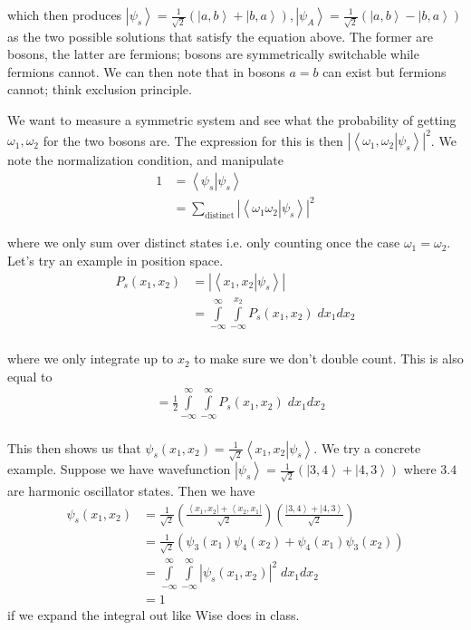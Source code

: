 \documentclass[10pt]{report}
\newcommand{\bra}[1]{\left<#1\right|}
\newcommand{\ket}[1]{\left|#1\right>}
\newcommand{\dotp}[2]{\left<#1\left.\right|#2\right>}
\newcommand{\abs}[1]{\left|#1\right|}
\begin{document}
which then produces $\ket{\psi_s} = \frac{1}{\sqrt{2}}\left(\ket{a,b} + \ket{b,a}\right), \ket{\psi_A} = \frac{1}{\sqrt{2}}\left(\ket{a,b}-\ket{b,a}\right)$ as the two possible solutions that satisfy the equation above. The former are bosons, the latter are fermions; bosons are symmetrically switchable while fermions cannot. We can then note that in bosons $a=b$ can exist but fermions cannot; think exclusion principle. 

We want to measure a symmetric system and see what the probability of getting $\omega_1, \omega_2$ for the two bosons are. The expression for this is then $\abs{\dotp{\omega_1,\omega_2}{\psi_s}}^2$. We note the normalization condition, and manipulate
\begin{align}
	1 &= \dotp{\psi_s}{\psi_s}\\
	&= \sum_{\textrm{distinct}} \abs{\dotp{\omega_1\omega_2}{\psi_s}}^2
\end{align}

where we only sum over distinct states i.e. only counting once the case $\omega_1 = \omega_2$. Let's try an example in position space.
\begin{align}
	P_s\left( x_1, x_2 \right) &= \abs{\dotp{x_1,x_2}{\psi_s}}\\
	&= \displaystyle\int\limits_{-\infty}^{\infty}\displaystyle\int\limits_{-\infty}^{x_2}P_s(x_1, x_2)\;dx_1dx_2\\
\end{align}

where we only integrate up to $x_2$ to make sure we don't double count. This is also equal to 
\begin{align}
	&= \frac{1}{2}\displaystyle\int\limits_{-\infty}^{\infty}\displaystyle\int\limits_{-\infty}^{\infty}P_s(x_1, x_2)\;dx_1dx_2\\
\end{align}

This then shows us that $\psi_s(x_1,x_2) = \frac{1}{\sqrt{2}}\dotp{x_1, x_2}{\psi_s}$. We try a concrete example. Suppose we have wavefunction $\ket{\psi_s} = \frac{1}{\sqrt{2}}\left(\ket{3,4} + \ket{4,3}\right)$ where $3.4$ are harmonic oscillator states. Then we have
\begin{align}
	\psi_s(x_1, x_2) &= \frac{1}{\sqrt{2}}\left( \frac{\bra{x_1,x_2} + \bra{x_2, x_1}}{\sqrt{2}} \right)\left( \frac{\ket{3,4} + \ket{4,3}}{\sqrt{2}} \right)\\
	&= \frac{1}{\sqrt{2}}\left( \psi_3(x_1)\psi_4(x_2) + \psi_4(x_1)\psi_3(x_2) \right)\\
	&= \displaystyle\int\limits_{-\infty}^{\infty}\displaystyle\int\limits_{-\infty}^{\infty}\abs{\psi_s(x_1,x_2)}^2\;dx_1dx_2\\
	&= 1
\end{align}
if we expand the integral out like Wise does in class. 
\end{document}
